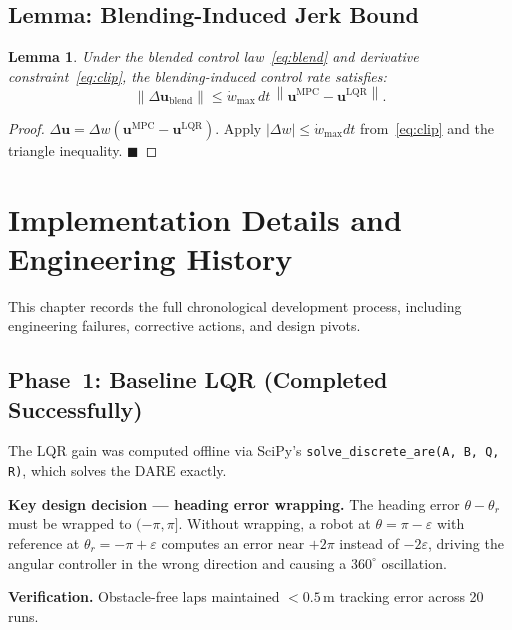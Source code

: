 \documentclass[12pt,a4paper,oneside]{report}
\newtheorem{lemma}[theorem]{Lemma}
\newcommand{\norm}[1]{\left\lVert#1\right\rVert}
\begin{document}
\section{Lemma: Blending-Induced Jerk Bound}

\begin{lemma}\label{lem:jerk}
  Under the blended control law~\eqref{eq:blend} and derivative
  constraint~\eqref{eq:clip}, the blending-induced control rate satisfies:
  \[\norm{\Delta\mathbf{u}_{\mathrm{blend}}} \leq
    \dot{w}_{\max}\,dt\,\norm{\mathbf{u}^{\mathrm{MPC}}-\mathbf{u}^{\mathrm{LQR}}}.\]
\end{lemma}

\begin{proof}
  \(\Delta\mathbf{u} = \Delta w(\mathbf{u}^{\mathrm{MPC}}-\mathbf{u}^{\mathrm{LQR}})\).
  Apply \(|\Delta w|\leq\dot{w}_{\max}dt\) from~\eqref{eq:clip} and the
  triangle inequality. \hfill\(\blacksquare\)
\end{proof}

\chapter{Implementation Details and Engineering History}\label{ch:impl}

This chapter records the full chronological development process, including
engineering failures, corrective actions, and design pivots.

\section{Phase~1: Baseline LQR (Completed Successfully)}

The LQR gain was computed offline via SciPy's
\texttt{solve\_discrete\_are(A, B, Q, R)}, which solves the DARE exactly.

\textbf{Key design decision — heading error wrapping.}  
The heading error \(\theta - \theta_r\) must be wrapped to \((-\pi,\pi]\).
Without wrapping, a robot at \(\theta=\pi-\varepsilon\) with reference at
\(\theta_r=-\pi+\varepsilon\) computes an error near \(+2\pi\) instead of
\(-2\varepsilon\), driving the angular controller in the wrong direction and
causing a \(360^\circ\) oscillation.

\textbf{Verification.} Obstacle-free laps maintained
\(<0.5\,\text{m}\) tracking error across 20 runs.
\end{document}
